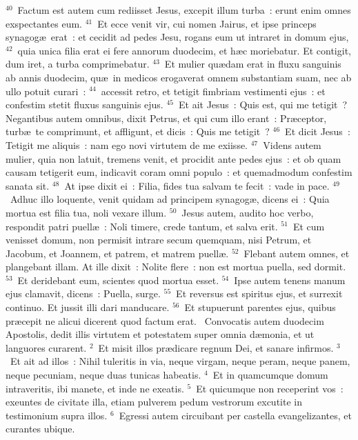 ${}^{40}$~Factum est autem cum rediisset Jesus, excepit illum turba~: erunt enim omnes exspectantes eum.
${}^{41}$~Et ecce venit vir, cui nomen Jairus, et ipse princeps synagog\ae\ erat~: et cecidit ad pedes Jesu, rogans eum ut intraret in domum ejus,
${}^{42}$~quia unica filia erat ei fere annorum duodecim, et h\ae c moriebatur. Et contigit, dum iret, a turba comprimebatur.
${}^{43}$~Et mulier qu\ae dam erat in fluxu sanguinis ab annis duodecim, qu\ae\ in medicos erogaverat omnem substantiam suam, nec ab ullo potuit curari~:
${}^{44}$~accessit retro, et tetigit fimbriam vestimenti ejus~: et confestim stetit fluxus sanguinis ejus.
${}^{45}$~Et ait Jesus~: Quis est, qui me tetigit~? Negantibus autem omnibus, dixit Petrus, et qui cum illo erant~: Pr\ae ceptor, turb\ae\ te comprimunt, et affligunt, et dicis~: Quis me tetigit~?
${}^{46}$~Et dicit Jesus~: Tetigit me aliquis~: nam ego novi virtutem de me exiisse.
${}^{47}$~Videns autem mulier, quia non latuit, tremens venit, et procidit ante pedes ejus~: et ob quam causam tetigerit eum, indicavit coram omni populo~: et quemadmodum confestim sanata sit.
${}^{48}$~At ipse dixit ei~: Filia, fides tua salvam te fecit~: vade in pace.
${}^{49}$~Adhuc illo loquente, venit quidam ad principem synagog\ae , dicens ei~: Quia mortua est filia tua, noli vexare illum.
${}^{50}$~Jesus autem, audito hoc verbo, respondit patri puell\ae~: Noli timere, crede tantum, et salva erit.
${}^{51}$~Et cum venisset domum, non permisit intrare secum quemquam, nisi Petrum, et Jacobum, et Joannem, et patrem, et matrem puell\ae .
${}^{52}$~Flebant autem omnes, et plangebant illam. At ille dixit~: Nolite flere~: non est mortua puella, sed dormit.
${}^{53}$~Et deridebant eum, scientes quod mortua esset.
${}^{54}$~Ipse autem tenens manum ejus clamavit, dicens~: Puella, surge.
${}^{55}$~Et reversus est spiritus ejus, et surrexit continuo. Et jussit illi dari manducare.
${}^{56}$~Et stupuerunt parentes ejus, quibus pr\ae cepit ne alicui dicerent quod factum erat.
~Convocatis autem duodecim Apostolis, dedit illis virtutem et potestatem super omnia d\ae monia, et ut languores curarent.
${}^{2}$~Et misit illos pr\ae dicare regnum Dei, et sanare infirmos.
${}^{3}$~Et ait ad illos~: Nihil tuleritis in via, neque virgam, neque peram, neque panem, neque pecuniam, neque duas tunicas habeatis.
${}^{4}$~Et in quamcumque domum intraveritis, ibi manete, et inde ne exeatis.
${}^{5}$~Et quicumque non receperint vos~: exeuntes de civitate illa, etiam pulverem pedum vestrorum excutite in testimonium supra illos.
${}^{6}$~Egressi autem circuibant per castella evangelizantes, et curantes ubique.


